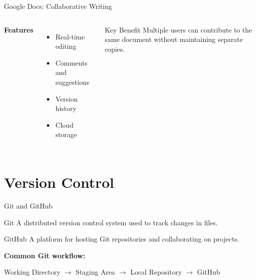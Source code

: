 \documentclass[aspectratio=169,11pt]{beamer}
\begin{document}
\begin{frame}{Google Docs: Collaborative Writing}

    \begin{columns}

        \textbf{Features}
        \begin{itemize}
            \item Real-time editing
            \item Comments and suggestions
            \item Version history
            \item Cloud storage
        \end{itemize}

        \begin{block}{Key Benefit}
            Multiple users can contribute
            to the same document without
            maintaining separate copies.
        \end{block}

    \end{columns}

\end{frame}

\section{Version Control}

\begin{frame}{Git and GitHub}

    \begin{block}{Git}
        A distributed version control system
        used to track changes in files.
    \end{block}

    \begin{block}{GitHub}
        A platform for hosting Git repositories
        and collaborating on projects.
    \end{block}

    \textbf{Common Git workflow:}

    \centering
    Working Directory
    $\rightarrow$ Staging Area
    $\rightarrow$ Local Repository
    $\rightarrow$ GitHub

\end{frame}
\end{document}
